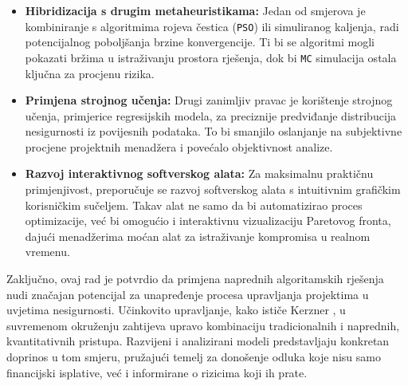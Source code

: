 \begin{itemize}
    \item \textbf{Hibridizacija s drugim metaheuristikama:} Jedan od smjerova je kombiniranje s algoritmima rojeva čestica (\texttt{PSO}) ili simuliranog kaljenja, radi potencijalnog poboljšanja brzine konvergencije. Ti bi se algoritmi mogli pokazati bržima u istraživanju prostora rješenja, dok bi \texttt{MC} simulacija ostala ključna za procjenu rizika.
    \item \textbf{Primjena strojnog učenja:} Drugi zanimljiv pravac je korištenje strojnog učenja, primjerice regresijskih modela, za preciznije predviđanje distribucija nesigurnosti iz povijesnih podataka. To bi smanjilo oslanjanje na subjektivne procjene projektnih menadžera i povećalo objektivnost analize.
    \item \textbf{Razvoj interaktivnog softverskog alata:} Za maksimalnu praktičnu primjenjivost, preporučuje se razvoj softverskog alata s intuitivnim grafičkim korisničkim sučeljem. Takav alat ne samo da bi automatizirao proces optimizacije, već bi omogućio i interaktivnu vizualizaciju Paretovog fronta, dajući menadžerima moćan alat za istraživanje kompromisa u realnom vremenu.
\end{itemize}

Zaključno, ovaj rad je potvrdio da primjena naprednih algoritamskih rješenja nudi značajan potencijal za unapređenje procesa upravljanja projektima u uvjetima nesigurnosti. Učinkovito upravljanje, kako ističe Kerzner \cite{Kerzner2017}, u suvremenom okruženju zahtijeva upravo kombinaciju tradicionalnih i naprednih, kvantitativnih pristupa. Razvijeni i analizirani modeli predstavljaju konkretan doprinos u tom smjeru, pružajući temelj za donošenje odluka koje nisu samo financijski isplative, već i informirane o rizicima koji ih prate.
